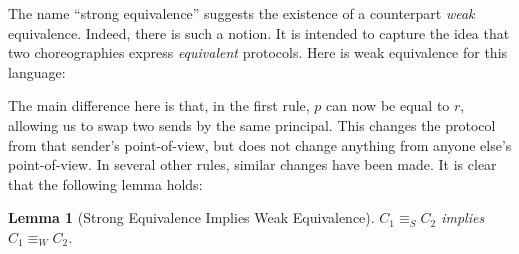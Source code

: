 \documentclass{article}
\newtheorem{lem}{Lemma}
\theoremstyle{definition}
\newcommand{\ceq}{\equiv}
\newcommand{\own}[2]{#1.#2}
\newcommand{\send}[3][]{#2\nolinebreak \mathrel{\xrightarrow{#1}}\nolinebreak #3}
\newcommand{\cif}[3]{\textsf{if}~#1 \mathrel{\textsf{then}}\nolinebreak #2 \mathrel{\textsf{else}}\nolinebreak #3}
\newcommand{\clet}[2]{\textsf{let}~#1\nolinebreak =\nolinebreak #2 \mathrel{\textsf{in}}}
\begin{document}
The name ``strong equivalence'' suggests the existence of a counterpart \emph{weak} equivalence.
Indeed, there is such a notion.
It is intended to capture the idea that two choreographies express \emph{equivalent} protocols.
Here is weak equivalence for this language:
\noindent{}
\noindent The main difference here is that, in the first rule, $p$ can now be equal to $r$, allowing us to swap two sends by the same principal.
This changes the protocol from that sender's point-of-view, but does not change anything from anyone else's point-of-view.
In several other rules, similar changes have been made.
It is clear that the following lemma holds:
\begin{lem}[Strong Equivalence Implies Weak Equivalence]
  $C_1 \ceq_S C_2$ implies $C_1 \ceq_W C_2$.
\end{lem}
\end{document}
